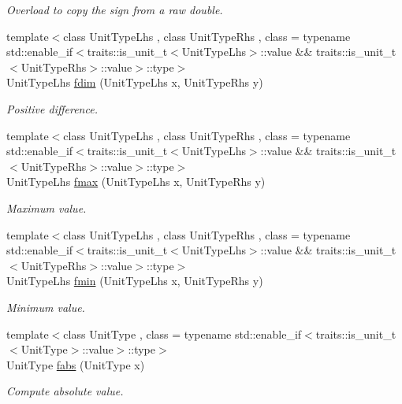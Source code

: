 \begin{DoxyCompactItemize}
\begin{DoxyCompactList}\small\item\em Overload to copy the sign from a raw double. \end{DoxyCompactList}\item 
{\footnotesize template$<$class Unit\+Type\+Lhs , class Unit\+Type\+Rhs , class  = typename std\+::enable\+\_\+if$<$traits\+::is\+\_\+unit\+\_\+t$<$\+Unit\+Type\+Lhs$>$\+::value \&\& traits\+::is\+\_\+unit\+\_\+t$<$\+Unit\+Type\+Rhs$>$\+::value$>$\+::type$>$ }\\Unit\+Type\+Lhs \hyperlink{group___unit_math_gab460b2830c1621552bafcdea8d8bf3dd}{fdim} (Unit\+Type\+Lhs x, Unit\+Type\+Rhs y)
\begin{DoxyCompactList}\small\item\em Positive difference. \end{DoxyCompactList}\item 
{\footnotesize template$<$class Unit\+Type\+Lhs , class Unit\+Type\+Rhs , class  = typename std\+::enable\+\_\+if$<$traits\+::is\+\_\+unit\+\_\+t$<$\+Unit\+Type\+Lhs$>$\+::value \&\& traits\+::is\+\_\+unit\+\_\+t$<$\+Unit\+Type\+Rhs$>$\+::value$>$\+::type$>$ }\\Unit\+Type\+Lhs \hyperlink{group___unit_math_ga3d09f87ec3b994b8030925816e2741fe}{fmax} (Unit\+Type\+Lhs x, Unit\+Type\+Rhs y)
\begin{DoxyCompactList}\small\item\em Maximum value. \end{DoxyCompactList}\item 
{\footnotesize template$<$class Unit\+Type\+Lhs , class Unit\+Type\+Rhs , class  = typename std\+::enable\+\_\+if$<$traits\+::is\+\_\+unit\+\_\+t$<$\+Unit\+Type\+Lhs$>$\+::value \&\& traits\+::is\+\_\+unit\+\_\+t$<$\+Unit\+Type\+Rhs$>$\+::value$>$\+::type$>$ }\\Unit\+Type\+Lhs \hyperlink{group___unit_math_gad0e605e80e01d7c415a65a51299ede67}{fmin} (Unit\+Type\+Lhs x, Unit\+Type\+Rhs y)
\begin{DoxyCompactList}\small\item\em Minimum value. \end{DoxyCompactList}\item 
{\footnotesize template$<$class Unit\+Type , class  = typename std\+::enable\+\_\+if$<$traits\+::is\+\_\+unit\+\_\+t$<$\+Unit\+Type$>$\+::value$>$\+::type$>$ }\\Unit\+Type \hyperlink{group___unit_math_ga947e9084d1a8f0bb89292af70887216c}{fabs} (Unit\+Type x)
\begin{DoxyCompactList}\small\item\em Compute absolute value. \end{DoxyCompactList}\item 

\end{DoxyCompactItemize}
